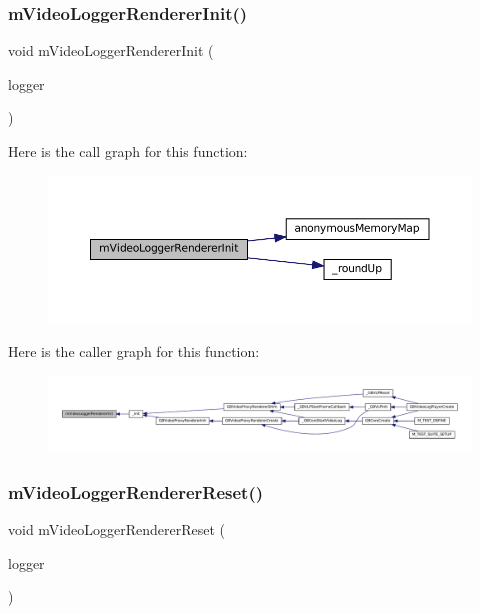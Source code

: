 \subsubsection{\texorpdfstring{m\+Video\+Logger\+Renderer\+Init()}{mVideoLoggerRendererInit()}}
{\footnotesize\ttfamily void m\+Video\+Logger\+Renderer\+Init (\begin{DoxyParamCaption}\item[{struct m\+Video\+Logger $\ast$}]{logger }\end{DoxyParamCaption})}

Here is the call graph for this function\+:
\nopagebreak
\begin{figure}[H]
\begin{center}
\leavevmode
\includegraphics[width=350pt]{video-logger_8c_a16bd9eb225160df41ea90b332634c267_cgraph}
\end{center}
\end{figure}
Here is the caller graph for this function\+:
\nopagebreak
\begin{figure}[H]
\begin{center}
\leavevmode
\includegraphics[width=350pt]{video-logger_8c_a16bd9eb225160df41ea90b332634c267_icgraph}
\end{center}
\end{figure}
\mbox{\label{video-logger_8c_adeafad306d275ef128d6f88bb2c28ea0}} 
\subsubsection{\texorpdfstring{m\+Video\+Logger\+Renderer\+Reset()}{mVideoLoggerRendererReset()}}
{\footnotesize\ttfamily void m\+Video\+Logger\+Renderer\+Reset (\begin{DoxyParamCaption}\item[{struct m\+Video\+Logger $\ast$}]{logger }\end{DoxyParamCaption})}

